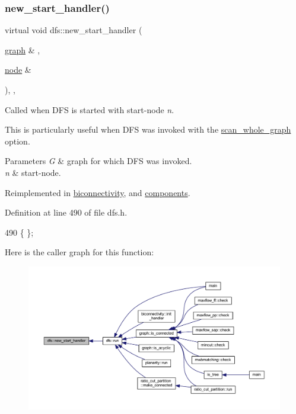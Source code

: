 \subsubsection{\texorpdfstring{new\+\_\+start\+\_\+handler()}{new\_start\_handler()}}
{\footnotesize\ttfamily virtual void dfs\+::new\+\_\+start\+\_\+handler (\begin{DoxyParamCaption}\item[{\mbox{\hyperlink{classgraph}{graph}} \&}]{,  }\item[{\mbox{\hyperlink{classnode}{node}} \&}]{ }\end{DoxyParamCaption})\hspace{0.3cm}{\ttfamily [inline]}, {\ttfamily [virtual]}, {\ttfamily [inherited]}}



Called when D\+FS is started with start-\/node {\itshape n}. 

This is particularly useful when D\+FS was invoked with the \mbox{\hyperlink{classdfs_aa7c864a6f3a120720138b187b3ed95b5}{scan\+\_\+whole\+\_\+graph}} option.


\begin{DoxyParams}{Parameters}
{\em G} & graph for which D\+FS was invoked. \\
\hline
{\em n} & start-\/node. \\
\hline
\end{DoxyParams}


Reimplemented in \mbox{\hyperlink{classbiconnectivity_ae94213830755f1f4d477ec6bff0f25b8}{biconnectivity}}, and \mbox{\hyperlink{classcomponents_af53365bd737b34cf63e4a6b10879ffcc}{components}}.



Definition at line 490 of file dfs.\+h.


\begin{DoxyCode}
490 \{ \};
\end{DoxyCode}
Here is the caller graph for this function\+:
\nopagebreak
\begin{figure}[H]
\begin{center}
\leavevmode
\includegraphics[width=350pt]{classdfs_a304b14458fb78f9feb3d8d5683d3cab5_icgraph}
\end{center}
\end{figure}
\mbox{\label{classdfs_a4efe5bb72d00305e6b226e67c2b2ef6e}} 
